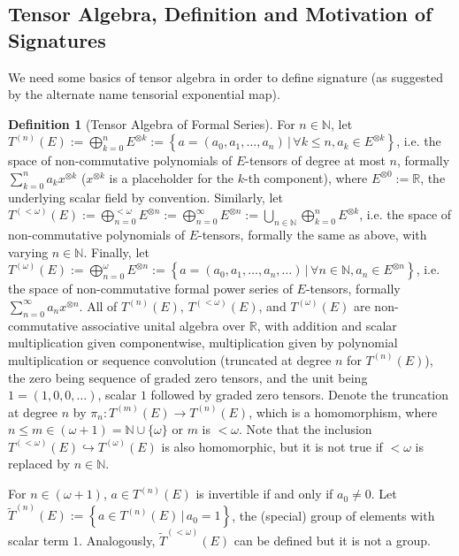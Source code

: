 \documentclass[fleqn]{article}
\theoremstyle{definition}
\newtheorem{defn}[thm]{Definition}
\theoremstyle{remark}
\begin{document}
\subsection{Tensor Algebra, Definition and Motivation of Signatures}
We need some basics of tensor algebra in order to define signature (as suggested by the alternate name tensorial exponential map).
\begin{defn}[Tensor Algebra of Formal Series]
For $n\in\mathbb{N}$, let $T^{(n)}(E):=\bigoplus_{k=0}^{n} E^{\otimes k}:=\left\{a=(a_0, a_1, \dots, a_n) \,\big|\, \forall k\le n, a_k \in E^{\otimes k} \right\}$, i.e. the space of non-commutative polynomials of $E$-tensors of degree at most $n$, formally $\sum_{k=0}^n a_k x^{\otimes k}$ ($x^{\otimes k}$ is a placeholder for the $k$-th component), where $E^{\otimes 0}:=\mathbb{R}$, the underlying scalar field by convention. Similarly, let $T^{(<\omega)}(E):=\bigoplus_{n=0}^{<\omega} E^{\otimes n}:=\bigoplus_{n=0}^\infty E^{\otimes n}:=\bigcup_{n\in\mathbb{N}} \bigoplus_{k=0}^n E^{\otimes k}$, i.e. the space of non-commutative polynomials of $E$-tensors, formally the same as above, with varying $n\in\mathbb{N}$. Finally, let $T^{(\omega)}(E):=\bigoplus_{n=0}^{\omega} E^{\otimes n}:=\left\{a=(a_0, a_1, \dots, a_n, \dots) \,\big|\, \forall n\in\mathbb{N}, a_n \in E^{\otimes n} \right\}$, i.e. the space of non-commutative formal power series of $E$-tensors, formally $\sum_{n=0}^\infty a_n x^{\otimes n}$. All of $T^{(n)}(E)$, $T^{(<\omega)}(E)$, and $T^{(\omega)}(E)$ are non-commutative associative unital algebra over $\mathbb{R}$, with addition and scalar multiplication given componentwise, multiplication given by polynomial multiplication or sequence convolution (truncated at degree $n$ for $T^{(n)}(E)$), the zero being sequence of graded zero tensors, and the unit being $1=(1,0,0,\dots)$, scalar $1$ followed by graded zero tensors. Denote the truncation at degree $n$ by $\pi_n:T^{(m)}(E) \to T^{(n)}(E)$, which is a homomorphism, where $n\le m\in(\omega+1)=\mathbb{N}\cup\{\omega\}$ or $m$ is $<\omega$. Note that the inclusion $T^{(<\omega)}(E) \hookrightarrow T^{(\omega)}(E)$ is also homomorphic, but it is not true if $<\omega$ is replaced by $n\in\mathbb{N}$.
\par
For $n\in(\omega+1)$, $a\in T^{(n)}(E)$ is invertible if and only if $a_0 \ne 0$. Let $\tilde{T}^{(n)}(E):=\left\{a\in T^{(n)}(E) \,\big|\, a_0=1 \right\}$, the (special) group of elements with scalar term $1$. Analogously, $\tilde{T}^{(<\omega)}(E)$ can be defined but it is not a group.
\end{defn}
\end{document}
